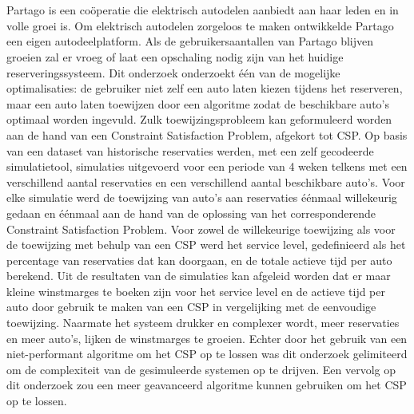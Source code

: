 \chapter*{}
Partago is een coöperatie die elektrisch autodelen aanbiedt aan haar leden en in volle groei is. Om elektrisch autodelen zorgeloos te maken ontwikkelde Partago een eigen autodeelplatform. Als de gebruikersaantallen van Partago blijven groeien zal er vroeg of laat een opschaling nodig zijn van het huidige reserveringssysteem. Dit onderzoek onderzoekt één van de mogelijke optimalisaties: de gebruiker niet zelf een auto laten kiezen tijdens het reserveren, maar een auto laten toewijzen door een algoritme zodat de beschikbare auto's optimaal worden ingevuld. Zulk toewijzingsprobleem kan geformuleerd worden aan de hand van een Constraint Satisfaction Problem, afgekort tot CSP. Op basis van een dataset van historische reservaties werden, met een zelf gecodeerde simulatietool, simulaties uitgevoerd voor een periode van 4 weken telkens met een verschillend aantal reservaties en een verschillend aantal beschikbare auto's. Voor elke simulatie werd de toewijzing van auto's aan reservaties éénmaal willekeurig gedaan en éénmaal aan de hand van de oplossing van het corresponderende Constraint Satisfaction Problem. Voor zowel de willekeurige toewijzing als voor de toewijzing met behulp van een CSP werd het service level, gedefinieerd als het percentage van reservaties dat kan doorgaan, en de totale actieve tijd per auto berekend. Uit de resultaten van de simulaties kan afgeleid worden dat er maar kleine winstmarges te boeken zijn voor het service level en de actieve tijd per auto door gebruik te maken van een CSP in vergelijking met de eenvoudige toewijzing. Naarmate het systeem drukker en complexer wordt, meer reservaties en meer auto's, lijken de winstmarges te groeien. Echter door het gebruik van een niet-performant algoritme om het CSP op te lossen was dit onderzoek gelimiteerd om de complexiteit van de gesimuleerde systemen op te drijven. Een vervolg op dit onderzoek zou een meer geavanceerd algoritme kunnen gebruiken om het CSP op te lossen.
